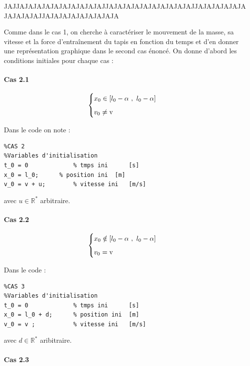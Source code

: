 \documentclass{article}
\begin{document}
\newpage
\color{red}JAJJAJAJAJAJAJAJAJAJAJAJJAJAJAJAJAJAJAJAJAJAJJAJAJAJAJAJAJAJAJAJAJJAJAJAJAJAJAJAJAJA \color{black}


Comme dans le cas 1, on cherche à caractériser le mouvement de la masse, sa vitesse et la force d'entraînement du tapis en fonction du temps et d'en donner une représentation graphique dans le second cas énoncé. On donne d'abord les conditions initiales pour chaque cas :

\paragraph{Cas 2.1}
 
$$
\begin{cases}
	\vspace{.2cm}
	x_0 \in [l_0-\alpha~,~l_0-\alpha]\\
	v_0\neq \text{v}
\end{cases}
$$

Dans le code on note :

\begin{lstlisting}
%CAS 2
%Variables d'initialisation
t_0 = 0 			% tmps ini		[s]
x_0 = l_0; 		% position ini	[m]
v_0 = v + u;		% vitesse ini	[m/s]     
\end{lstlisting}

avec $u\in \mathbb{R}^*$ arbitraire.

\paragraph{Cas 2.2}

$$
\begin{cases}
	\vspace{.2cm}
	x_0 \notin [l_0-\alpha~,~l_0-\alpha]\\
	v_0= \text{v}
\end{cases}
$$

Dans le code :

\begin{lstlisting}
%CAS 3
%Variables d'initialisation
t_0 = 0				% tmps ini		[s]
x_0 = l_0 + d;		% position ini	[m]
v_0 = v ;			% vitesse ini	[m/s]       
\end{lstlisting}

avec $d\in \mathbb{R}^*$ aribitraire.

\paragraph{Cas 2.3}
\end{document}
